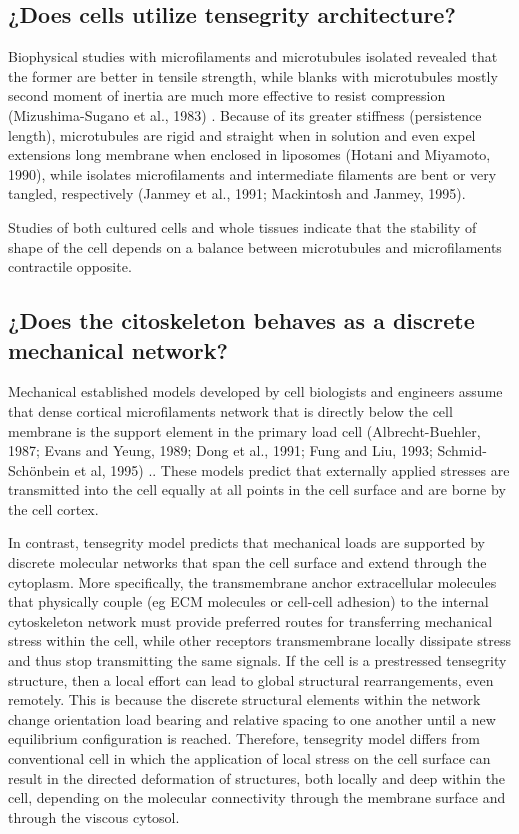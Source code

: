 \subsection{¿Does cells utilize tensegrity architecture?}

    Biophysical studies with microfilaments and microtubules isolated revealed that the former are better in tensile strength, while blanks with microtubules mostly second moment of inertia are much more effective to resist compression (Mizushima-Sugano et al., 1983) . Because of its greater stiffness (persistence length), microtubules are rigid and straight when in solution and even expel extensions long membrane when enclosed in liposomes (Hotani and Miyamoto, 1990), while isolates microfilaments and intermediate filaments are bent or very tangled, respectively (Janmey et al., 1991; Mackintosh and Janmey, 1995).

    Studies of both cultured cells and whole tissues indicate that the stability of shape of the cell depends on a balance between microtubules and microfilaments contractile opposite.

\subsection{¿Does the citoskeleton behaves as a discrete mechanical network?}

    Mechanical established models developed by cell biologists and engineers assume that dense cortical microfilaments network that is directly below the cell membrane is the support element in the primary load cell (Albrecht-Buehler, 1987; Evans and Yeung, 1989; Dong et al., 1991; Fung and Liu, 1993; Schmid-Schönbein et al, 1995) .. These models predict that externally applied stresses are transmitted into the cell equally at all points in the cell surface and are borne by the cell cortex.

    In contrast, tensegrity model predicts that mechanical loads are supported by discrete molecular networks that span the cell surface and extend through the cytoplasm. More specifically, the transmembrane anchor extracellular molecules that physically couple (eg ECM molecules or cell-cell adhesion) to the internal cytoskeleton network must provide preferred routes for transferring mechanical stress within the cell, while other receptors transmembrane locally dissipate stress and thus stop transmitting the same signals. If the cell is a prestressed tensegrity structure, then a local effort can lead to global structural rearrangements, even remotely. This is because the discrete structural elements within the network change orientation load bearing and relative spacing to one another until a new equilibrium configuration is reached. Therefore, tensegrity model differs from conventional cell in which the application of local stress on the cell surface can result in the directed deformation of structures, both locally and deep within the cell, depending on the molecular connectivity through the membrane surface and through the viscous cytosol.

